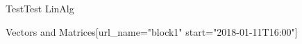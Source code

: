 \documentclass[12pt]{article}
\begin{document}
\begin{edXcourse}{Test}{Test LinAlg}
\begin{edXchapter}{Vectors and Matrices}[url_name="block1" start="2018-01-11T16:00"]
\endedxsequential



\def\edxbaseoutputname{b1intoonto}







% 

\endedxsequential



\end{edXchapter}




\end{edXcourse}
\end{document}
